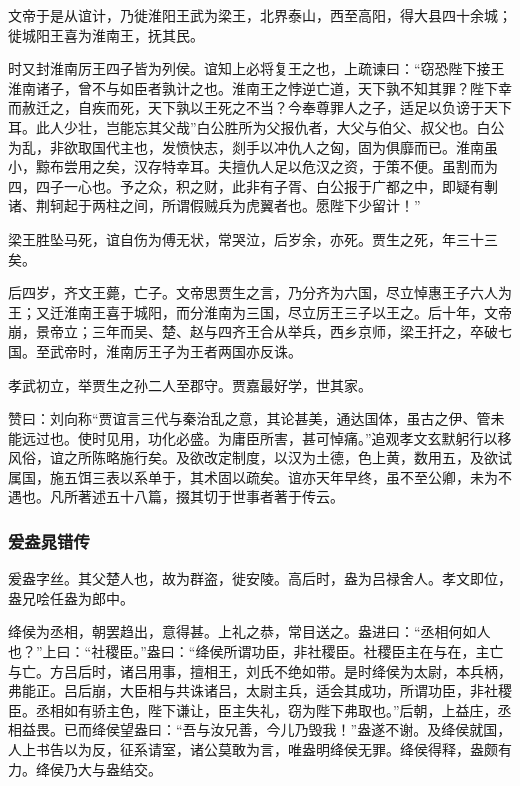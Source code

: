 \documentclass[]{article}
\begin{document}
文帝于是从谊计，乃徙淮阳王武为梁王，北界泰山，西至高阳，得大县四十余城；徙城阳王喜为淮南王，抚其民。

时又封淮南厉王四子皆为列侯。谊知上必将复王之也，上疏谏曰：``窃恐陛下接王淮南诸子，曾不与如臣者孰计之也。淮南王之悖逆亡道，天下孰不知其罪？陛下幸而赦迁之，自疾而死，天下孰以王死之不当？今奉尊罪人之子，适足以负谤于天下耳。此人少壮，岂能忘其父哉''白公胜所为父报仇者，大父与伯父、叔父也。白公为乱，非欲取国代主也，发愤快志，剡手以冲仇人之匈，固为俱靡而已。淮南虽小，黥布尝用之矣，汉存特幸耳。夫擅仇人足以危汉之资，于策不便。虽割而为四，四子一心也。予之众，积之财，此非有子胥、白公报于广都之中，即疑有剸诸、荆轲起于两柱之间，所谓假贼兵为虎翼者也。愿陛下少留计！''

梁王胜坠马死，谊自伤为傅无状，常哭泣，后岁余，亦死。贾生之死，年三十三矣。

后四岁，齐文王薨，亡子。文帝思贾生之言，乃分齐为六国，尽立悼惠王子六人为王；又迁淮南王喜于城阳，而分淮南为三国，尽立厉王三子以王之。后十年，文帝崩，景帝立；三年而吴、楚、赵与四齐王合从举兵，西乡京师，梁王扞之，卒破七国。至武帝时，淮南厉王子为王者两国亦反诛。

孝武初立，举贾生之孙二人至郡守。贾嘉最好学，世其家。

赞曰：刘向称``贾谊言三代与秦治乱之意，其论甚美，通达国体，虽古之伊、管未能远过也。使时见用，功化必盛。为庸臣所害，甚可悼痛。''追观孝文玄默躬行以移风俗，谊之所陈略施行矣。及欲改定制度，以汉为土德，色上黄，数用五，及欲试属国，施五饵三表以系单于，其术固以疏矣。谊亦天年早终，虽不至公卿，未为不遇也。凡所著述五十八篇，掇其切于世事者著于传云。

\hypertarget{header-n4139}{%
\subsubsection{爰盎晁错传}\label{header-n4139}}

爰盎字丝。其父楚人也，故为群盗，徙安陵。高后时，盎为吕禄舍人。孝文即位，盎兄哙任盎为郎中。

绛侯为丞相，朝罢趋出，意得甚。上礼之恭，常目送之。盎进曰：``丞相何如人也？''上曰：``社稷臣。''盎曰：``绛侯所谓功臣，非社稷臣。社稷臣主在与在，主亡与亡。方吕后时，诸吕用事，擅相王，刘氏不绝如带。是时绛侯为太尉，本兵柄，弗能正。吕后崩，大臣相与共诛诸吕，太尉主兵，适会其成功，所谓功臣，非社稷臣。丞相如有骄主色，陛下谦让，臣主失礼，窃为陛下弗取也。''后朝，上益庄，丞相益畏。已而绛侯望盎曰：``吾与汝兄善，今儿乃毁我！''盎遂不谢。及绛侯就国，人上书告以为反，征系请室，诸公莫敢为言，唯盎明绛侯无罪。绛侯得释，盎颇有力。绛侯乃大与盎结交。
\end{document}
